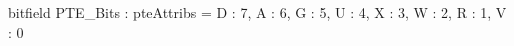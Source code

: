 bitfield PTE_Bits : pteAttribs = {
  D : 7,
  A : 6,
  G : 5,
  U : 4,
  X : 3,
  W : 2,
  R : 1,
  V : 0
}
